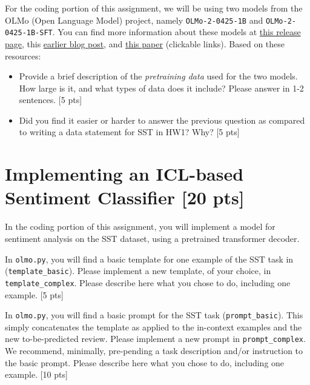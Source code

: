 \documentclass[11pt]{article}
\begin{document}
 For the coding portion of this assignment, we will be using two models from the OLMo (Open Language Model) project, namely \texttt{OLMo-2-0425-1B} and \texttt{OLMo-2-0425-1B-SFT}.  You can find more information about these models at \href{https://allenai.org/olmo/release-notes#olmo-2-1b}{this release page}, this \href{https://allenai.org/blog/olmo2}{earlier blog post}, and \href{https://arxiv.org/abs/2501.00656}{this paper} (clickable links).  Based on these resources:
\begin{itemize}
  \item Provide a brief description of the \emph{pretraining data} used for the two models.  How large is it, and what types of data does it include?  Please answer in 1-2 sentences. \hfill [5 pts]
  \item Did you find it easier or harder to answer the previous question as compared to writing a data statement for SST in HW1? Why? \hfill [5 pts]
\end{itemize}



\section{Implementing an ICL-based Sentiment Classifier [20 pts]}

In the coding portion of this assignment, you will implement a model for sentiment analysis on the SST dataset, using a pretrained transformer decoder.  

\vspace{2em}
  In \texttt{olmo.py}, you will find a basic template for one example of the SST task in (\texttt{template\_basic}).  Please implement a new template, of your choice, in \texttt{template\_complex}.  Please describe here what you chose to do, including one example. \hfill [5 pts]

\vspace{2em}
  In \texttt{olmo.py}, you will find a basic prompt for the SST task (\texttt{prompt\_basic}).  This simply concatenates the template as applied to the in-context examples and the new to-be-predicted review.  Please implement a new prompt in \texttt{prompt\_complex}.  We recommend, minimally, pre-pending a task description and/or instruction to the basic prompt. Please describe here what you chose to do, including one example. \hfill [10 pts]
\end{document}

